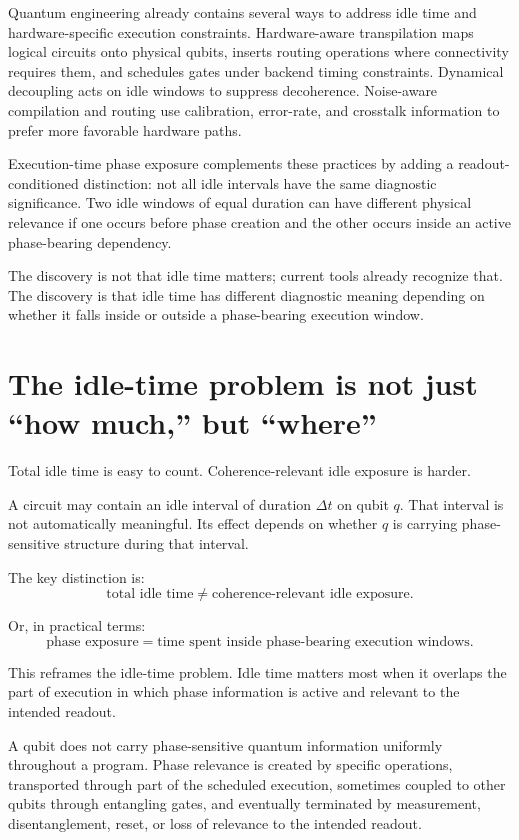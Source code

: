 \documentclass[11pt]{article}
\begin{document}
Quantum engineering already contains several ways to address idle time and hardware-specific execution constraints. Hardware-aware transpilation maps logical circuits onto physical qubits, inserts routing operations where connectivity requires them, and schedules gates under backend timing constraints. Dynamical decoupling acts on idle windows to suppress decoherence. Noise-aware compilation and routing use calibration, error-rate, and crosstalk information to prefer more favorable hardware paths.

Execution-time phase exposure complements these practices by adding a readout-conditioned distinction: not all idle intervals have the same diagnostic significance. Two idle windows of equal duration can have different physical relevance if one occurs before phase creation and the other occurs inside an active phase-bearing dependency.

The discovery is not that idle time matters; current tools already recognize that. The discovery is that idle time has different diagnostic meaning depending on whether it falls inside or outside a phase-bearing execution window.

\section*{The idle-time problem is not just ``how much,'' but ``where''}

Total idle time is easy to count. Coherence-relevant idle exposure is harder.

A circuit may contain an idle interval of duration \(\Delta t\) on qubit \(q\). That interval is not automatically meaningful. Its effect depends on whether \(q\) is carrying phase-sensitive structure during that interval.

The key distinction is:
\[
\text{total idle time} \neq \text{coherence-relevant idle exposure}.
\]

Or, in practical terms:
\[
\text{phase exposure} = \text{time spent inside phase-bearing execution windows}.
\]

This reframes the idle-time problem. Idle time matters most when it overlaps the part of execution in which phase information is active and relevant to the intended readout.

A qubit does not carry phase-sensitive quantum information uniformly throughout a program. Phase relevance is created by specific operations, transported through part of the scheduled execution, sometimes coupled to other qubits through entangling gates, and eventually terminated by measurement, disentanglement, reset, or loss of relevance to the intended readout.
\end{document}
